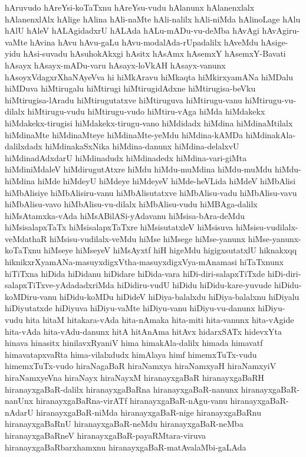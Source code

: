 {hAruvudo
hAreYsi-koTaTxnu
hAreYsu-vudu
hAlanunx
hAlanenxlalx
hAlanenxlAlx
hAlige
hAlina
hAli-naMte
hAli-nalilx
hAli-niMda
hAlinoLage
hAlu
hAlU
hAleV
hALAgidadxrU
hALAda
hALu-mADu-vu-deMba
hAvAgi
hAvAgiru-vaMte
hAvina
hAvu
hAvu-gaLu
hAvu-modalAda-rUpadalilx
hAveMdu
hAsige-yidu
hAsi-suvadu
hAsuhokAkxgi
hAsitx
hAsAmx
hAsemxY
hAsemxY-Bavati
hAsayx
hAsayx-mADu-varu
hAsayx-loVkAH
hAsayx-vanunx
hAsoyxVdagxrXhaNAyeVva
hi
hiMkAravu
hiMkaqta
hiMkirxyamANa
hiMDalu
hiMDuva
hiMtirugalu
hiMtirugi
hiMtirugidAdxne
hiMtirugisa-beVku
hiMtirugisa-lAradu
hiMtirugutatxve
hiMtiruguva
hiMtirugu-vanu
hiMtirugu-vu-dilalx
hiMtirugu-vudu
hiMtirugu-vudo
hiMtiru-vAga
hiMda
hiMdakekx
hiMdakekx-tirugisi
hiMdakekx-tirugu-vano
hiMdidadx
hiMdina
hiMdinaMtilalx
hiMdinaMte
hiMdinaMteye
hiMdinaMte-yeMdu
hiMdina-kAMDa
hiMdinakAla-dalilxdadx
hiMdinakaSxNika
hiMdina-danunx
hiMdina-delalxvU
hiMdinadAdxdarU
hiMdinadudx
hiMdinadedx
hiMdina-vari-giMta
hiMdiniMdaleV
hiMdirugutAtxre
hiMdu
hiMdu-muMdina
hiMdu-muMdu
hiMdu-hiMdina
hiMde
hiMdeyU
hiMdeye
hiMdeyeV
hiMde-heVLida
hiMdeV
hiMbAlisi
hiMbAlisiye
hiMbAlisiru-vanu
hiMbAlisutatxve
hiMbAlisu-vadu
hiMbAlisu-vavu
hiMbAlisu-vavo
hiMbAlisu-vu-dilalx
hiMbAlisu-vudu
hiMBAga-dalilx
hiMsAtamxka-vAda
hiMsABilASi-yAdavanu
hiMsisa-bAra-deMdu
hiMsisalapxTaTx
hiMsisalapxTaTxre
hiMsisutatxleV
hiMsisuva
hiMsisu-vudilalx-veMdathaR
hiMsisu-vudilalx-veMdu
hiMse
hiMsege
hiMse-yanunx
hiMse-yanunx-koTaTxnu
hiMseye
hiMseyeV
hiMsAyxtf
hiH
higeMdu
higigxsutatxlU
hiknakxqq
hiknikxrXyamANa-masuyxdigxVtha-masuyxdigxVya-mAnamasi
hiTaTxnunx
hiTiTxna
hiDida
hiDidanu
hiDidare
hiDida-vara
hiDi-diri-salapxTiTxde
hiDi-diri-salapxTiTxve-yAdadadxriMda
hiDidiru-vudU
hiDidu
hiDidu-kare-yuvude
hiDidu-koMDiru-vanu
hiDidu-koMDu
hiDideV
hiDiya-balalxdu
hiDiya-balalxnu
hiDiyalu
hiDiyutatxde
hiDiyuva
hiDiyu-vaMte
hiDiyu-vanu
hiDiyu-vu-danunx
hiDiyu-vudu
hita
hitaM
hitakara-vAda
hita-nAmaka
hita-miti
hita-vanunx
hita-vAgide
hita-vAda
hita-vAdu-danunx
hitA
hitAnAma
hitAvx
hidarxSATx
hidevxYta
hinava
hinasitx
hinilavxRyaniV
hima
himakAla-dalilx
himada
himavatf
himavatapxvaRta
hima-vilalxdudx
himAlaya
himf
himemxTuTx-vudu
himemxTuTx-vudo
hiraNagaBaR
hiraNamxya
hiraNamxyaH
hiraNamxyiV
hiraNamxyeVna
hiraNayx
hiraNayxM
hiranayxgaBaR
hiranayxgaBaRH
hiranayxgaBaR-dalilx
hiranayxgaBaRna
hiranayxgaBaR-nanunx
hiranayxgaBaR-nanUnx
hiranayxgaBaRna-virATf
hiranayxgaBaR-nAgu-vanu
hiranayxgaBaR-nAdarU
hiranayxgaBaR-niMda
hiranayxgaBaR-nige
hiranayxgaBaRnu
hiranayxgaBaRnU
hiranayxgaBaR-neMdu
hiranayxgaBaR-neMba
hiranayxgaBaRneV
hiranayxgaBaR-payaRMtara-viruva
hiranayxgaBaRbarxhamxnu
hiranayxgaBaR-matAvalaMbi-gaLAda
}
